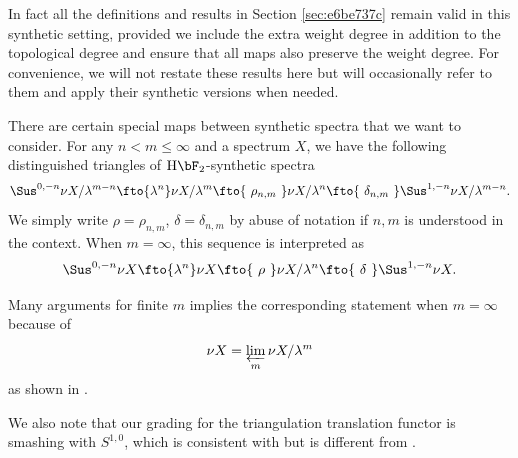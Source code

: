 \documentclass{amsart}
\numberwithin{equation}{section}
\newcommand{\HF}{\mathrm{H}\bF_2}
\begin{document}
In fact all the definitions and results in Section \ref{sec:e6be737c} remain valid in this synthetic setting, provided we include the extra weight degree in addition to the topological degree and ensure that all maps also preserve the weight degree. For convenience, we will not restate these results here but will occasionally refer to them and apply their synthetic versions when needed.

\begin{notation} \label{not:deltaandrho}
There are certain special maps between synthetic spectra that we want to consider. For any $n<m\le \infty$ and a spectrum $X$, we have the following  distinguished triangles of $\HF$-synthetic spectra
$$\Sus^{0,-n}\nu X/\lambda^{m-n}\fto{\lambda^n} \nu X/\lambda^m\fto{~\rho_{n,m}~} \nu X/\lambda^n\fto{~\delta_{n,m}~} \Sus^{1,-n}\nu X/\lambda^{m-n}.$$
We simply write $\rho=\rho_{n,m}$, $\delta=\delta_{n,m}$ by abuse of notation if $n,m$ is understood in the context.
When $m=\infty$, this sequence is interpreted  as
$$\Sus^{0,-n}\nu X\fto{\lambda^n} \nu X\fto{~\rho~} \nu X/\lambda^n\fto{~\delta~} \Sus^{1,-n}\nu X.$$

Many arguments for finite $m$ implies the corresponding statement when $m=\infty$ because of
$$\nu X=\varprojlim_{m} \nu X/\lambda^m$$
as shown in \cite[Proposition A.13]{BHS}.

We also note that our grading for the triangulation translation functor is smashing with $S^{1,0}$, which is consistent with \cite[Appendix A]{BHS} but is different from \cite[Section 7]{BurklundXu}.
\end{notation}

\end{document}
